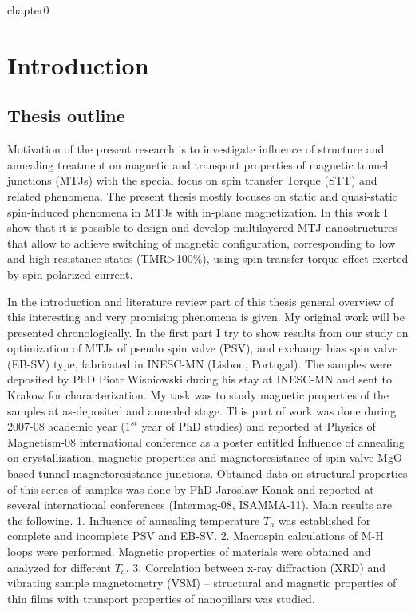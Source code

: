 \renewcommand{\bibname} %
\setcounter{chapter}{0}

\chapter{Introduction}
\section{Thesis outline}

Motivation of the present research is to investigate influence of structure and annealing treatment on magnetic and transport properties of magnetic tunnel junctions (MTJs) with the special focus on spin transfer Torque (STT) and related phenomena. The present thesis mostly focuses on static and quasi-static spin-induced phenomena in MTJs with in-plane magnetization.
In this work I show that it is possible to design and develop multilayered MTJ nanostructures that allow to achieve switching of magnetic configuration, corresponding to low and high resistance states (TMR>100\%), using spin transfer torque effect exerted by spin-polarized current.

In the introduction and literature review part of this thesis general overview of this interesting and very promising phenomena is given. My original work will be presented chronologically. In the first part I try to show results from our study on optimization of MTJs of pseudo spin valve (PSV), and exchange bias spin valve (EB-SV) type, fabricated in INESC-MN (Lisbon, Portugal). The samples were deposited by PhD Piotr Wisniowski during his stay at INESC-MN and sent to Krakow for characterization. My task was to study magnetic properties of the samples %
at as-deposited and annealed stage. This part of work was done during 2007-08 academic year ($1^{st}$ year of PhD studies) and reported at Physics of Magnetism-08 international conference as a poster entitled \'Influence of annealing on crystallization, magnetic properties and magnetoresistance of spin valve MgO-based tunnel magnetoresistance junctions.
Obtained data on structural properties of this series of samples was done by PhD Jaroslaw Kanak and reported at several international conferences (Intermag-08, ISAMMA-11). 
Main results are the following.
1. Influence of annealing temperature $T_a$ was established for complete and incomplete PSV and EB-SV.
2. Macrospin calculations of M-H loops were performed. Magnetic properties of materials were obtained and analyzed for different $T_a$.
3. Correlation between x-ray diffraction (XRD) and vibrating sample magnetometry (VSM) -- structural and magnetic properties of thin films with transport properties of nanopillars was studied.

